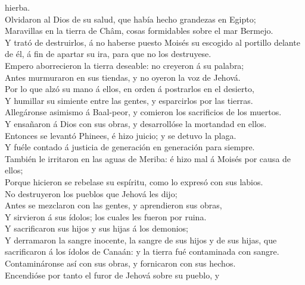hierba.\\
 Olvidaron al Dios de su salud, que había hecho grandezas
en Egipto;\\
 Maravillas en la tierra de Châm, cosas formidables sobre
el mar Bermejo.\\
 Y trató de destruirlos, á no haberse puesto Moisés su
escogido al portillo delante de él, á fin de apartar su ira, para que no
los destruyese.\\
 Empero aborrecieron la tierra deseable: no creyeron á su
palabra;\\
 Antes murmuraron en sus tiendas, y no oyeron la voz de
Jehová.\\
 Por lo que alzó su mano á ellos, en orden á postrarlos en
el desierto,\\
 Y humillar su simiente entre las gentes, y esparcirlos por
las tierras.\\
 Allegáronse asimismo á Baal-peor, y comieron los
sacrificios de los muertos.\\
 Y ensañaron á Dios con sus obras, y desarrollóse la
mortandad en ellos.\\
 Entonces se levantó Phinees, é hizo juicio; y se detuvo la
plaga.\\
 Y fuéle contado á justicia de generación en generación
para siempre.\\
 También le irritaron en las aguas de Meriba: é hizo mal á
Moisés por causa de ellos;\\
 Porque hicieron se rebelase su espíritu, como lo expresó
con sus labios.\\
 No destruyeron los pueblos que Jehová les dijo;\\
 Antes se mezclaron con las gentes, y aprendieron sus
obras,\\
 Y sirvieron á sus ídolos; los cuales les fueron por
ruina.\\
 Y sacrificaron sus hijos y sus hijas á los demonios;\\
 Y derramaron la sangre inocente, la sangre de sus hijos y
de sus hijas, que sacrificaron á los ídolos de Canaán: y la tierra fué
contaminada con sangre.\\
 Contamináronse así con sus obras, y fornicaron con sus
hechos.\\
 Encendióse por tanto el furor de Jehová sobre su pueblo, y

